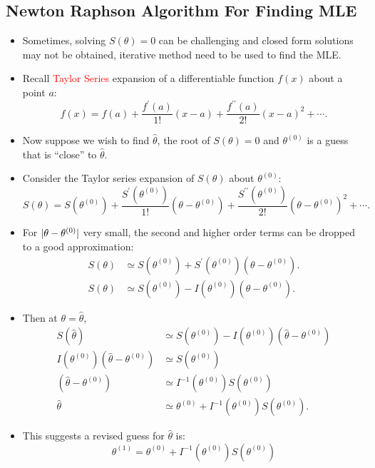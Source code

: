 \documentclass[oneside]{book}\usepackage[]{graphicx}\usepackage[svgnames]{xcolor}
\DeclarePairedDelimiter\abs{\lvert}{\rvert}
\begin{document}
\subsection*{Newton Raphson Algorithm For Finding MLE}
\begin{itemize}
      \item Sometimes, solving $ S(\theta)=0 $ can be challenging and closed form solutions may
            not be obtained, iterative method need to be used to find the MLE.
      \item Recall \textcolor{Red}{Taylor Series} expansion of a differentiable function $ f(x) $ about a point $ a $:
            \[ f(x)=f(a)+\frac{f^\prime(a)}{1!}(x-a)+\frac{f^{\prime\prime}(a)}{2!}(x-a)^2+\cdots.  \]
      \item Now suppose we wish to find $ \hat{\theta} $, the root of $ S(\theta)=0 $ and $ \theta^{(0)} $ is a guess that
            is ``close'' to $ \hat{\theta} $.
      \item Consider the Taylor series expansion of $ S(\theta) $ about $ \theta^{(0)} $:
            \[ S(\theta)=S(\theta^{(0)})+\frac{S^{\prime}(\theta^{(0)})}{1!}(\theta-\theta^{(0)})+\frac{S^{\prime\prime}(\theta^{(0)})}{2!}(\theta-\theta^{(0)})^2+\cdots.   \]
      \item For $ \abs{\theta-\theta^{(0)}} $ very small, the second and higher order terms can be dropped to a good approximation:
            \begin{align*}
                  S(\theta) & \simeq S(\theta^{(0)})+S^\prime(\theta^{(0)})(\theta-\theta^{(0)}). \\
                  S(\theta) & \simeq S(\theta^{(0)})-I(\theta^{(0)})(\theta-\theta^{(0)}).
            \end{align*}
      \item Then at $ \theta=\hat{\theta} $,
            \begin{align*}
                  S(\hat{\theta})                            & \simeq S(\theta^{(0)})-I(\theta^{(0)})(\hat{\theta}-\theta^{(0)}) \\
                  I(\theta^{(0)})(\hat{\theta}-\theta^{(0)}) & \simeq S(\theta^{(0)})                                            \\
                  (\hat{\theta}-\theta^{(0)})                & \simeq I^{-1}(\theta^{(0)})S(\theta^{(0)})                        \\
                  \hat{\theta}                               & \simeq \theta^{(0)}+I^{-1}(\theta^{(0)})S(\theta^{(0)}).
            \end{align*}
      \item This suggests a revised guess for $ \hat{\theta} $ is:
            \[ \theta^{(1)}=\theta^{(0)}+I^{-1}(\theta^{(0)})S(\theta^{(0)}) \]
\end{itemize}
\end{document}
